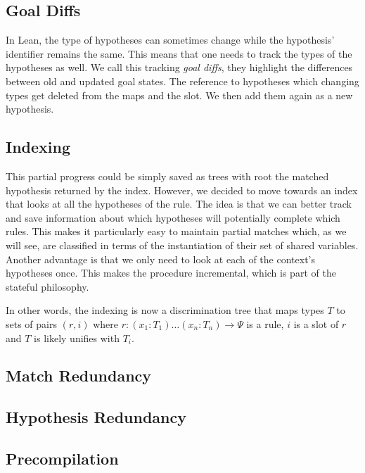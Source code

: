 \documentclass[runningheads]{llncs}
\newcommand{\jcom}[1]{{\color{orange}{Jannis: #1}} }
\begin{document}
\subsection{Goal Diffs}

\jcom{Remove this whole section as too low-level?}
In Lean, the type of hypotheses can sometimes change while the hypothesis' identifier remains the same.
This means that one needs to track the types of the hypotheses as well.
We call this tracking \textit{goal diffs}, they highlight the differences between old and updated goal states.
The reference to hypotheses which changing types get deleted from the maps and the slot.
We then add them again as a new hypothesis.

\subsection{Indexing}

\jcom{TODO adjust}

This partial progress could be simply saved as trees with root the matched hypothesis returned by the index.
However, we decided to move towards an index that looks at all the hypotheses of the rule.
The idea is that we can better track and save information about which hypotheses will potentially complete which rules.
This makes it particularly easy to maintain partial matches which, as we will see, are classified in terms of the instantiation of their set of shared variables.
Another advantage is that we only need to look at each of the context's hypotheses once.
This makes the procedure incremental, which is part of the stateful philosophy.

In other words, the indexing is now a discrimination tree that maps types $T$ to sets of pairs $(r,i)$ where $r : (x_1 : T_1) \dots (x_n : T_n) \to \Psi$ is a rule, $i$ is a slot of $r$ and $T$ is likely unifies with $T_i$.

\subsection{Match Redundancy}

\subsection{Hypothesis Redundancy}

\jcom{Mention here that we also use this for the naive algorithm.}

\subsection{Precompilation}
\end{document}
